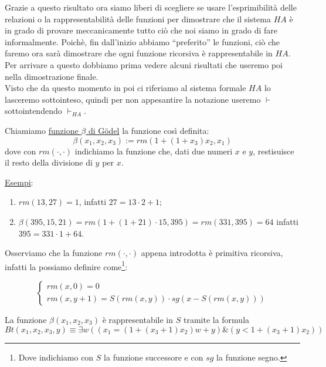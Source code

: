Grazie a questo risultato ora siamo liberi di scegliere se usare l'esprimibilit\`a delle relazioni o la rappresentabilit\`a delle funzioni per dimostrare che il sistema $HA$ \`e in grado di provare meccanicamente tutto ci\`o che noi siamo in grado di fare informalmente. Poich\`e, fin dall'inizio abbiamo "`preferito"' le funzioni, ci\`o che faremo ora sar\`a dimostrare che ogni funzione ricorsiva \`e rappresentabile in $HA$. Per arrivare a questo dobbiamo prima vedere alcuni risultati che useremo poi nella dimostrazione finale. \\
Visto che da questo momento in poi ci riferiamo al sistema formale $HA$ lo lasceremo sottointeso, quindi per non appesantire la notazione useremo $\vdash$ sottointendendo $\vdash_{HA}$.

\begin{defi}
Chiamiamo \underline{funzione $\beta$ di G\"odel} la funzione cos\`i definita:
$$ \beta (x_{1}, x_{2}, x_{3}):=rm(1+(1+x_{3})x_{2}, x_{1})$$
dove con $rm(\cdot,\cdot)$ indichiamo la funzione che, dati due numeri $x$ e $y$, restisuisce il resto della divisione di $y$ per $x$. 
\end{defi}
\underline{Esempi}:
\begin{enumerate}
  \item $rm(13,27)=1$, infatti $27=13\cdot2+1$;
  \item $\beta(395,15,21)=rm(1+(1+21)\cdot15,395)=rm(331,395)=64$ infatti $395=331\cdot1+64$.
\end{enumerate}

Osserviamo che la funzione $rm(\cdot,\cdot)$ appena introdotta \`e primitiva ricorsiva, infatti la possiamo definire come\footnote{Dove indichiamo con $S$ la funzione successore e con $sg$ la funzione segno.}:

$$
\left \{ \begin{array} {ll}
rm(x,0)=0 \\
rm(x,y+1)=S(rm(x,y))\cdot sg(x- S(rm(x,y)))
\end{array} \right. 
$$ \newline

\begin{prop}
La funzione $\beta(x_{1}, x_{2}, x_{3})$ \`e rappresentabile in $S$ tramite la formula
$$ Bt(x_{1}, x_{2}, x_{3}, y)\equiv \exists w ((x_{1}=(1+(x_{3}+1)x_{2})w +y )\&(y<1+(x_{3}+1)x_{2})) $$
\end{prop}

